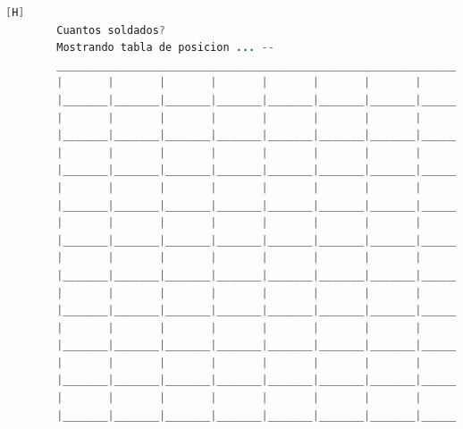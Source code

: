 \documentclass{article}
\begin{document}
	\begin{lstlisting}[language=java,caption={Las lineas de codigos del metodo creado: \textcolor{red}{VER EL TEXTO EN LATEX EN LA IMAGEN SE DEFORMA O EJECUTARLO}}][H]
		Cuantos soldados? 
		Mostrando tabla de posicion ... -- 
		_________________________________________________________________________________
		|       |       |       |       |       |       |       |       |       |       |
		|_______|_______|_______|_______|_______|_______|_______|_______|_______|_______|
		|       |       |       |       |       |       |       |       |       |       |
		|_______|_______|_______|_______|_______|_______|_______|_______|_______|_______|
		|       |       |       |       |       |       |       |       |       |       |
		|_______|_______|_______|_______|_______|_______|_______|_______|_______|_______|
		|       |       |       |       |       |       |       |       |       |       |
		|_______|_______|_______|_______|_______|_______|_______|_______|_______|_______|
		|       |       |       |       |       |       |       |       |       |       |
		|_______|_______|_______|_______|_______|_______|_______|_______|_______|_______|
		|       |       |       |       |       |       |       |       |       |       |
		|_______|_______|_______|_______|_______|_______|_______|_______|_______|_______|
		|       |       |       |       |       |       |       |       |       |       |
		|_______|_______|_______|_______|_______|_______|_______|_______|_______|_______|
		|       |       |       |       |       |       |       |       |       |       |
		|_______|_______|_______|_______|_______|_______|_______|_______|_______|_______|
		|       |       |       |       |       |       |       |       |       |       |
		|_______|_______|_______|_______|_______|_______|_______|_______|_______|_______|
		|       |       |       |       |       |       |       |       |       |       |
		|_______|_______|_______|_______|_______|_______|_______|_______|_______|_______|
		
	\end{lstlisting}
\end{document}
